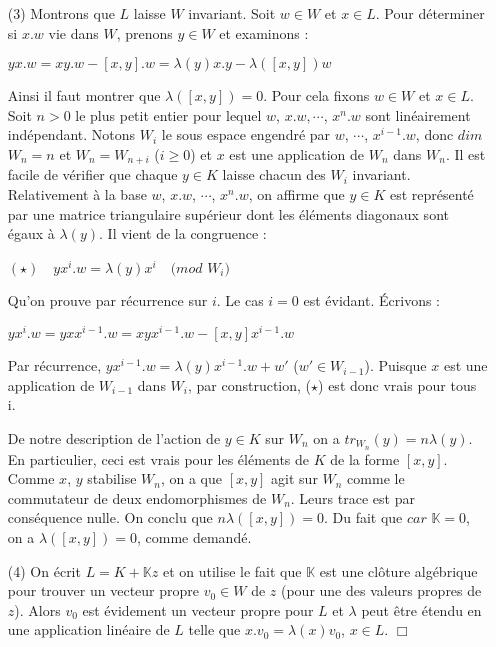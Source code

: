 \documentclass[a4paper,openany,12pt]{report}
\newcommand{\KK}{\mathbb{K}}
\theoremstyle{break}
{\theorembodyfont{\upshape}
\newtheorem*{rmq}{Remarque :}
\newtheorem*{prv}{Preuve :}
\newtheorem*{ex}{Exemples :}
\newtheorem*{exe}{Exemple : }
\newtheorem*{nota}{Notation :}
\newtheorem*{dem}{D\'emonstration :}}
\begin{document}
\begin{dem}
\begin{itemize}
\item[(3)] Montrons que $L$ laisse $W$ invariant. Soit $w \in W$ et $x \in L$. Pour déterminer si $x.w$ vie dans $W$, prenons $y \in W$ et examinons :
\begin{center}
$yx.w=xy.w-[x,y].w= \lambda(y)x.y- \lambda([x,y])w $
\end{center}
Ainsi il faut montrer que $\lambda([x,y])=0$. Pour cela fixons $w \in W$ et $x \in L$. Soit $n>0$ le plus petit entier pour lequel $w$, $x.w, \cdots$, $x^{n}.w$ sont linéairement indépendant. Notons $W_{i}$ le sous espace engendré par $w$, $\cdots$, $x^{i-1}.w$, donc $dim$ $W_{n}=n$ et $W_{n}=W_{n+i}$ ($i\geq 0$) et $x$ est une application de $W_{n}$ dans $W_{n}$. Il est facile de vérifier que chaque $y \in K$ laisse chacun des $W_{i}$ invariant. Relativement à la base $w$, $x.w$, $\cdots$, $x^{n}.w$, on affirme que $y \in K$ est représenté par une matrice triangulaire supérieur dont les éléments diagonaux sont égaux à $\lambda(y)$. Il vient de la congruence :
\begin{center}
$(\star) \quad yx^{i}.w = \lambda(y)x^{i} \quad (mod$ $W_{i})$
\end{center}
Qu'on prouve par récurrence sur $i$. Le cas $i=0$ est évidant. Écrivons :
\begin{center}
$yx^{i}.w = yxx^{i-1}.w = xyx^{i-1}.w -[x,y]x^{i-1}.w $
\end{center}
Par récurrence, $yx^{i-1}.w = \lambda(y)x^{i-1}.w+w'$ ($w' \in W_{i-1}$). Puisque $x$ est une application de $W_{i-1}$ dans $W_{i}$, par construction, ($\star$) est donc vrais pour tous i.

De notre description de l'action de $y \in K$ sur $W_{n}$ on a $tr_{W_{n}}(y)=n \lambda(y)$. En particulier, ceci est vrais pour les éléments de $K$ de la forme $[x,y]$. Comme $x$, $y$ stabilise $W_{n}$, on a que $[x,y]$ agit sur $W_{n}$ comme le commutateur de deux endomorphismes de $W_{n}$. Leurs trace est par conséquence nulle. On conclu que $n \lambda([x,y]) = 0$. Du fait que $car$ $\KK=0$, on a $\lambda([x,y])=0$, comme demandé.

\item[(4)] On écrit $L=K+ \KK z$ et on utilise le fait que $\KK$ est une clôture algébrique pour trouver un vecteur propre $v_{0} \in W$ de $z$ (pour une des valeurs propres de $z$). Alors $v_{0}$ est évidement un vecteur propre pour $L$ et $\lambda$ peut être étendu en une application linéaire de $L$ telle que $x.v_{0} = \lambda(x)v_{0}$, $x \in L$. $\Box$
\end{itemize}
\end{dem}
\end{document}
